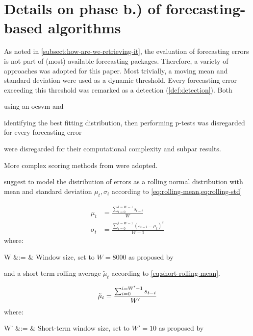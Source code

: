 \section{Details on phase b.) of forecasting-based algorithms}\label{sec:forecasting-eval}
As noted in \cref{subsect:how-are-we-retrieving-it}, the evaluation of forecasting
errors is not part of (most) available forecasting packages. Therefore, a variety
of approaches was adopted for this paper. Most trivially, a moving mean and standard
deviation were used as a dynamic threshold. Every forecasting error exceeding this
threshold was remarked as a detection (\cref{def:detection}). Both 
\begin{enumerate*}
    \item using an \gls{ocsvm} and 
    \item identifying the best fitting distribution, then performing p-tests was
    disregarded for every forecasting error
\end{enumerate*}
were disregarded for their computational complexity and subpar results.

More complex scoring methods from \cite{Ahmad.2017,Hundman.2018} were adopted.

\textcite{Ahmad.2017} suggest to model the distribution of errors as a rolling normal
distribution with mean and standard deviation \(\mu_t, \sigma_t\) according to
\cref{eq:rolling-mean,eq:rolling-std}

\begin{align}
    \mu_t&= \frac{\sum_{i=0}^{i=W-1}s_{t-i}}{W}\label{eq:rolling-mean}\\
    \sigma_t &= \frac{\sum_{i=0}^{i=W-1}{(s_{t-i}-\mu_t)}^2}{W - 1}\label{eq:rolling-std}
\end{align}
where:
\begin{conditions}
    W &:= & Window size, set to \(W=8000\) as proposed by~\cite{Ahmad.2017}
\end{conditions}

and a short term rolling average \(\tilde{\mu}_t\) according to \cref{eq:short-rolling-mean}.

\begin{equation}
    \tilde{\mu}_t = \frac{\sum_{i=0}^{i=W'-1}s_{t-i}}{W'}\label{eq:short-rolling-mean}\\
\end{equation}
where:
\begin{conditions}
    W' &:= & Short-term window size, set to \(W'=10\) as proposed by~\cite{Ahmad.2017}
\end{conditions}

